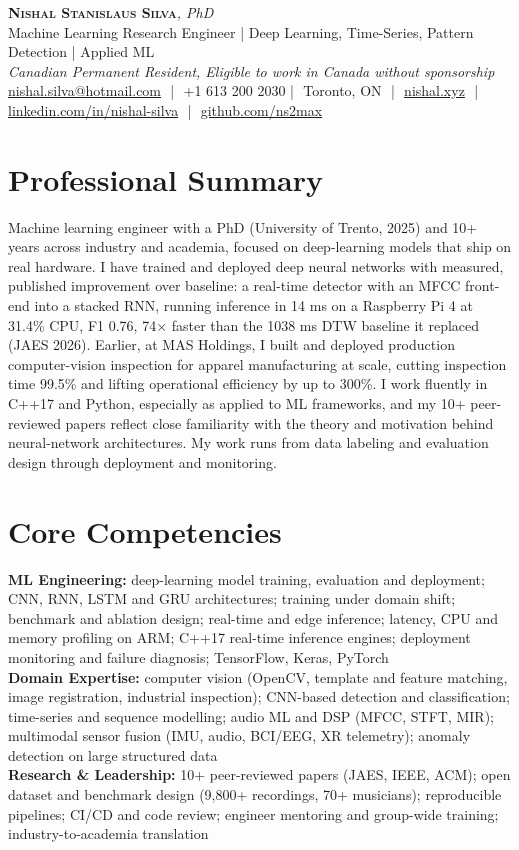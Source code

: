 \documentclass[11pt]{article}
\makeatletter
\newcommand{\cvName}{Nishal Stanislaus Silva}
\newcommand{\cvEmail}{nishal.silva@hotmail.com}
\newcommand{\cvPhone}{+1 613 200 2030}
\newcommand{\cvCity}{Toronto, ON}
\newcommand{\cvSite}{https://nishal.xyz}
\newcommand{\cvLinkedIn}{https://www.linkedin.com/in/nishal-silva}
\newcommand{\cvGitHub}{https://github.com/ns2max}
\newcommand{\cvStatus}{Canadian Permanent Resident, Eligible to work in Canada without sponsorship}
\newcommand{\cvTagline}{Machine Learning Research Engineer | Deep Learning, Time-Series, Pattern Detection | Applied ML}
\makeatother
\begin{document}
\pagestyle{empty}
\begin{center}
    {\LARGE \scshape \textbf{\cvName}}{\large \textit{, PhD}}\\[1pt]
    {\small \cvTagline}\\[1pt]
    {\footnotesize\textit{\cvStatus}}\\[1pt]
    {\small
    \href{mailto:\cvEmail}{\cvEmail} \,\,|\,\, \cvPhone \,\,|\,\, \cvCity
    \,\,|\,\, \href{\cvSite}{nishal.xyz} \,\,|\,\, \href{\cvLinkedIn}{linkedin.com/in/nishal-silva}
    \,\,|\,\, \href{\cvGitHub}{github.com/ns2max}}
\end{center}

\section*{Professional Summary}

Machine learning engineer with a PhD (University of Trento, 2025) and 10+ years across industry and academia, focused on deep-learning models that ship on real hardware. I have trained and deployed deep neural networks with measured, published improvement over baseline: a real-time detector with an MFCC front-end into a stacked RNN, running inference in 14 ms on a Raspberry Pi 4 at 31.4\% CPU, F1 0.76, 74$\times$ faster than the 1038 ms DTW baseline it replaced (JAES 2026). Earlier, at MAS Holdings, I built and deployed production computer-vision inspection for apparel manufacturing at scale, cutting inspection time 99.5\% and lifting operational efficiency by up to 300\%. I work fluently in C++17 and Python, especially as applied to ML frameworks, and my 10+ peer-reviewed papers reflect close familiarity with the theory and motivation behind neural-network architectures. My work runs from data labeling and evaluation design through deployment and monitoring.

\section*{Core Competencies}

\textbf{ML Engineering:} deep-learning model training, evaluation and deployment; CNN, RNN, LSTM and GRU architectures; training under domain shift; benchmark and ablation design; real-time and edge inference; latency, CPU and memory profiling on ARM; C++17 real-time inference engines; deployment monitoring and failure diagnosis; TensorFlow, Keras, PyTorch\\
\textbf{Domain Expertise:} computer vision (OpenCV, template and feature matching, image registration, industrial inspection); CNN-based detection and classification; time-series and sequence modelling; audio ML and DSP (MFCC, STFT, MIR); multimodal sensor fusion (IMU, audio, BCI/EEG, XR telemetry); anomaly detection on large structured data\\
\textbf{Research \& Leadership:} 10+ peer-reviewed papers (JAES, IEEE, ACM); open dataset and benchmark design (9,800+ recordings, 70+ musicians); reproducible pipelines; CI/CD and code review; engineer mentoring and group-wide training; industry-to-academia translation
\end{document}

